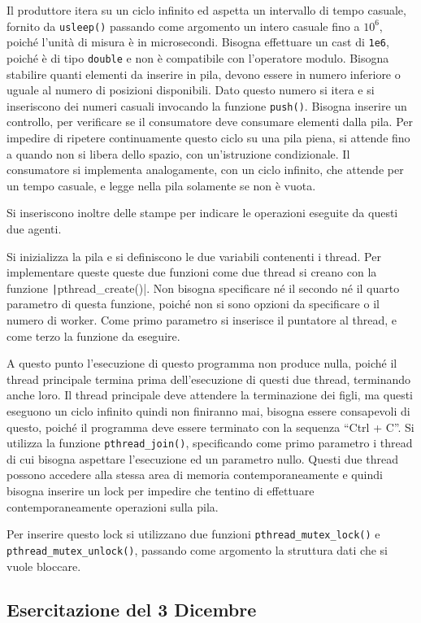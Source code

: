 \documentclass{article}
\numberwithin{equation}{subsection}
\begin{document}
Il produttore itera su un ciclo infinito ed aspetta un intervallo di tempo 
casuale, fornito da \verb|usleep()| passando come argomento un intero 
casuale fino a $10^6$, poiché l'unità di misura è in microsecondi. 
Bisogna effettuare un cast di \verb|1e6|, poiché è di tipo \verb|double| e non 
è compatibile con l'operatore modulo. Bisogna stabilire 
quanti elementi da inserire in pila, devono essere in numero inferiore o uguale 
al numero di posizioni disponibili. Dato questo numero si 
itera e si inseriscono dei numeri casuali invocando la funzione \verb|push()|. 
Bisogna inserire un controllo, per verificare se il consumatore deve consumare 
elementi dalla pila. Per impedire di ripetere continuamente questo ciclo 
su una pila piena, si attende fino a quando non si libera dello spazio, 
con un'istruzione condizionale. 
Il consumatore si implementa analogamente, con un ciclo infinito, che 
attende per un tempo casuale, e legge nella pila solamente se non è vuota. 

Si inseriscono inoltre delle stampe per indicare le operazioni eseguite 
da questi due agenti. 

Si inizializza la pila e si definiscono le due variabili contenenti 
i thread. 
Per implementare queste queste due funzioni come due thread si creano 
con la funzione \texttt|pthread\_create()|. Non bisogna specificare né il 
secondo né il quarto parametro di questa funzione, poiché non si sono 
opzioni da specificare o il numero di worker. Come primo parametro si 
inserisce il puntatore al thread, e come terzo la funzione da eseguire. 

A questo punto l'esecuzione di questo programma non produce nulla, poiché il thread 
principale termina prima dell'esecuzione di questi due thread, terminando 
anche loro. 
Il thread principale deve attendere la terminazione dei figli, ma questi 
eseguono un ciclo infinito quindi non finiranno mai, bisogna essere 
consapevoli di questo, poiché il programma deve essere terminato con la 
sequenza ``Ctrl + C''. Si utilizza la funzione \verb|pthread_join()|, 
specificando come primo parametro i thread di cui bisogna aspettare l'esecuzione 
ed un parametro nullo. Questi due thread possono accedere alla stessa area di memoria 
contemporaneamente e quindi bisogna inserire un lock per impedire che 
tentino di effettuare contemporaneamente operazioni sulla pila. 

Per inserire questo lock si utilizzano due funzioni \verb|pthread_mutex_lock()| 
e \verb|pthread_mutex_unlock()|, passando come argomento la struttura dati 
che si vuole bloccare. 

\subsection{Esercitazione del 3 Dicembre}
\end{document}
